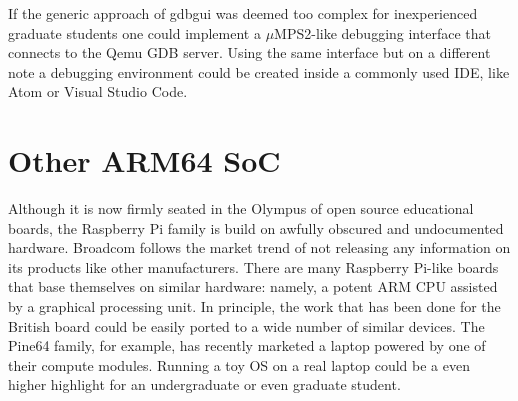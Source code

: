\documentclass[12pt,a4paper,openright,twoside]{report}
\begin{document}
If the generic approach of gdbgui was deemed too complex for inexperienced graduate
students one could implement a $\mu$MPS2-like debugging interface that connects
to the Qemu GDB server. Using the same interface but on a different note a
debugging environment could be created inside a commonly used IDE, like Atom or 
Visual Studio Code.

\section{Other ARM64 SoC}
Although it is now firmly seated in the Olympus of open source educational boards,
the Raspberry Pi family is build on awfully obscured and undocumented hardware.
Broadcom follows the market trend of not releasing any information on its 
products like other manufacturers.
There are many Raspberry Pi-like boards that base themselves on similar hardware:
namely, a potent ARM CPU assisted by a graphical processing unit. In principle,
the work that has been done for the British board could be easily ported to a 
wide number of similar devices. The Pine64 family, for example, has recently
marketed a laptop powered by one of their compute modules. Running a toy
OS on a real laptop could be a even higher highlight for an undergraduate
or even graduate student.
\end{document}

